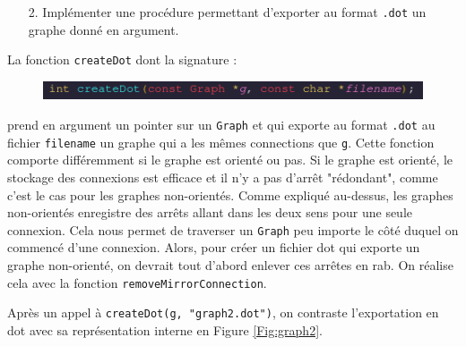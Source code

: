 \documentclass[10pt]{article} %
\begin{document}
\begin{itemize}
    \item [2.] Implémenter une procédure permettant d'exporter au format \texttt{.dot} un graphe donné en argument.
\end{itemize}



La fonction \texttt{createDot} dont la signature :

\newpage
\begin{figure}[h!]
    \centering
    \includegraphics[height=.5cm]{media/createDot.png}
\end{figure}

prend en argument un pointer sur un \texttt{Graph} et qui exporte au format \texttt{.dot} au fichier \texttt{filename} un graphe qui a les mêmes connections
que \texttt{g}. Cette fonction comporte différemment si le graphe est orienté ou pas. Si le graphe est orienté, le stockage des connexions est efficace et il n'y a pas
d'arrêt "rédondant", comme c'est le cas pour les graphes non-orientés. Comme expliqué au-dessus, les graphes non-orientés enregistre des arrêts allant dans les deux
sens pour une seule connexion. Cela nous permet de traverser un \texttt{Graph} peu importe le côté duquel on commencé d'une connexion. Alors, pour créer un fichier
dot qui exporte un graphe non-orienté, on devrait tout d'abord enlever ces arrêtes en rab. On réalise cela avec la fonction \texttt{removeMirrorConnection}.

Après un appel à \texttt{createDot(g, "graph2.dot")}, on contraste l'exportation en dot avec sa représentation interne en Figure \ref{Fig:graph2}.
\end{document}
